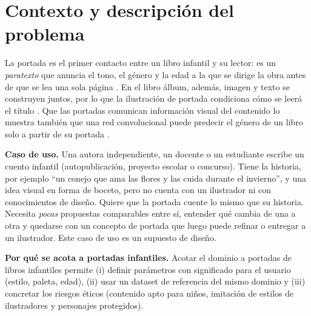\documentclass[10pt,a4paper,twocolumn]{article}
\begin{document}
\section{Contexto y descripción del problema}
La portada es el primer contacto entre un libro infantil y su lector: es un \emph{paratexto} que anuncia el tono, el género y la edad a la que se dirige la obra antes de que se lea una sola página \citep{genette1997,nikolajeva2001}. En el libro álbum, además, imagen y texto se construyen juntos, por lo que la ilustración de portada condiciona cómo se leerá el título \citep{nikolajeva2001}. Que las portadas comunican información visual del contenido lo muestra también que una red convolucional puede predecir el género de un libro solo a partir de su portada \citep{iwana2016}.

\textbf{Caso de uso.} Una autora independiente, un docente o un estudiante escribe un cuento infantil (autopublicación, proyecto escolar o concurso). Tiene la historia, por ejemplo ``un conejo que ama las flores y las cuida durante el invierno'', y una idea visual en forma de boceto, pero no cuenta con un ilustrador ni con conocimientos de diseño. Quiere que la portada cuente lo mismo que su historia. Necesita \emph{pocas} propuestas comparables entre sí, entender qué cambia de una a otra y quedarse con un concepto de portada que luego puede refinar o entregar a un ilustrador. Este caso de uso es un supuesto de diseño.

\textbf{Por qué se acota a portadas infantiles.} Acotar el dominio a portadas de libros infantiles permite (i) definir parámetros con significado para el usuario (estilo, paleta, edad), (ii) usar un dataset de referencia del mismo dominio y (iii) concretar los riesgos éticos (contenido apto para niños, imitación de estilos de ilustradores y personajes protegidos).
\end{document}
